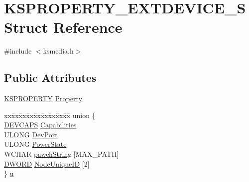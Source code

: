 \hypertarget{struct_k_s_p_r_o_p_e_r_t_y___e_x_t_d_e_v_i_c_e___s}{}\section{K\+S\+P\+R\+O\+P\+E\+R\+T\+Y\+\_\+\+E\+X\+T\+D\+E\+V\+I\+C\+E\+\_\+S Struct Reference}
\label{struct_k_s_p_r_o_p_e_r_t_y___e_x_t_d_e_v_i_c_e___s}


{\ttfamily \#include $<$ksmedia.\+h$>$}

\subsection*{Public Attributes}
\begin{DoxyCompactItemize}
\item 
\hyperlink{ks_8h_a4392f77c74e868d813d46c39ada4d660}{K\+S\+P\+R\+O\+P\+E\+R\+TY} \hyperlink{struct_k_s_p_r_o_p_e_r_t_y___e_x_t_d_e_v_i_c_e___s_a7cff40f3355d9886502e0a62099a62b2}{Property}
\item 
\begin{tabbing}
xx\=xx\=xx\=xx\=xx\=xx\=xx\=xx\=xx\=\kill
union \{\\
\>\hyperlink{ksmedia_8h_a394a5b2d0c747cce10f98659bfb778bd}{DEVCAPS} \hyperlink{struct_k_s_p_r_o_p_e_r_t_y___e_x_t_d_e_v_i_c_e___s_ab99e72e90c7b58dc6d16e684fdb0a0c1}{Capabilities}\\
\>ULONG \hyperlink{struct_k_s_p_r_o_p_e_r_t_y___e_x_t_d_e_v_i_c_e___s_a6811bf6f44ea23f501a5369d5e3c9fa2}{DevPort}\\
\>ULONG \hyperlink{struct_k_s_p_r_o_p_e_r_t_y___e_x_t_d_e_v_i_c_e___s_a38436a5b78bacfc95e295d37e4a76374}{PowerState}\\
\>WCHAR \hyperlink{struct_k_s_p_r_o_p_e_r_t_y___e_x_t_d_e_v_i_c_e___s_a7f4ff0ff1c45f76998b2d63c94e138e0}{pawchString} \mbox{[}MAX\_PATH\mbox{]}\\
\>\hyperlink{mapinls_8h_ad342ac907eb044443153a22f964bf0af}{DWORD} \hyperlink{struct_k_s_p_r_o_p_e_r_t_y___e_x_t_d_e_v_i_c_e___s_aee2ecab6009eaebb6dfe1be12eebe931}{NodeUniqueID} \mbox{[}2\mbox{]}\\
\} \hyperlink{struct_k_s_p_r_o_p_e_r_t_y___e_x_t_d_e_v_i_c_e___s_a3d4f3135b014533b91896f6d55c540cd}{u}\\

\end{tabbing}\end{DoxyCompactItemize}


